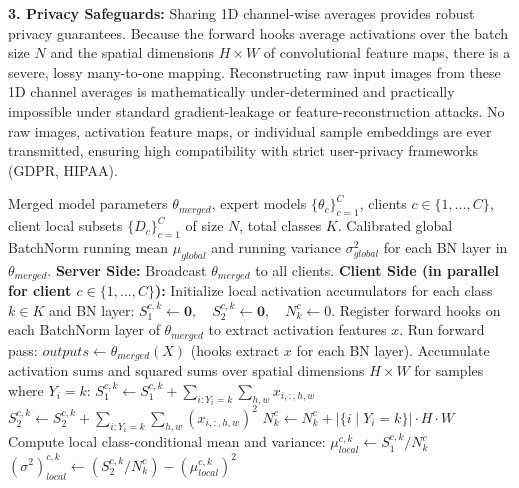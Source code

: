\documentclass{article}
\theoremstyle{plain}
\theoremstyle{definition}
\theoremstyle{remark}
\begin{document}
\textbf{3. Privacy Safeguards:}
Sharing 1D channel-wise averages provides robust privacy guarantees. Because the forward hooks average activations over the batch size $N$ and the spatial dimensions $H \times W$ of convolutional feature maps, there is a severe, lossy many-to-one mapping. Reconstructing raw input images from these 1D channel averages is mathematically under-determined and practically impossible under standard gradient-leakage or feature-reconstruction attacks. No raw images, activation feature maps, or individual sample embeddings are ever transmitted, ensuring high compatibility with strict user-privacy frameworks (GDPR, HIPAA).

\begin{algorithm}[t]
\caption{Class-Conditional Federated BatchNorm Calibration (CC-Fed-BNC)}
\label{alg:cc_fed_bnc}
\footnotesize
\begin{algorithmic}[1]
\REQUIRE Merged model parameters $\theta_{merged}$, expert models $\{\theta_c\}_{c=1}^C$, clients $c \in \{1,\dots,C\}$, client local subsets $\{D_c\}_{c=1}^C$ of size $N$, total classes $K$.
\ENSURE Calibrated global BatchNorm running mean $\mu_{global}$ and running variance $\sigma_{global}^2$ for each BN layer in $\theta_{merged}$.
\STATE \textbf{Server Side:}
\STATE Broadcast $\theta_{merged}$ to all clients.
\STATE \textbf{Client Side (in parallel for client $c \in \{1,\dots,C\}$):}
\STATE Initialize local activation accumulators for each class $k \in K$ and BN layer:
\STATE $S_1^{c,k} \leftarrow \mathbf{0}, \quad S_2^{c,k} \leftarrow \mathbf{0}, \quad N_k^c \leftarrow 0$.
\STATE Register forward hooks on each BatchNorm layer of $\theta_{merged}$ to extract activation features $x$.
    \STATE Run forward pass: $outputs \leftarrow \theta_{merged}(X)$ (hooks extract $x$ for each BN layer).
        \STATE Accumulate activation sums and squared sums over spatial dimensions $H \times W$ for samples where $Y_i = k$:
        \STATE $S_1^{c,k} \leftarrow S_1^{c,k} + \sum_{i: Y_i = k} \sum_{h,w} x_{i, :, h, w}$
        \STATE $S_2^{c,k} \leftarrow S_2^{c,k} + \sum_{i: Y_i = k} \sum_{h,w} (x_{i, :, h, w})^2$
        \STATE $N_k^c \leftarrow N_k^c + |\{i \mid Y_i = k\}| \cdot H \cdot W$
    \ENDFOR
\ENDFOR
{}
    \STATE Compute local class-conditional mean and variance:
    \STATE $\mu_{local}^{c,k} \leftarrow S_1^{c,k} / N_k^c$
    \STATE $(\sigma^2)_{local}^{c,k} \leftarrow (S_2^{c,k} / N_k^c) - (\mu_{local}^{c,k})^2$
\ENDFOR

\end{algorithmic}
\end{algorithm}
\end{document}
